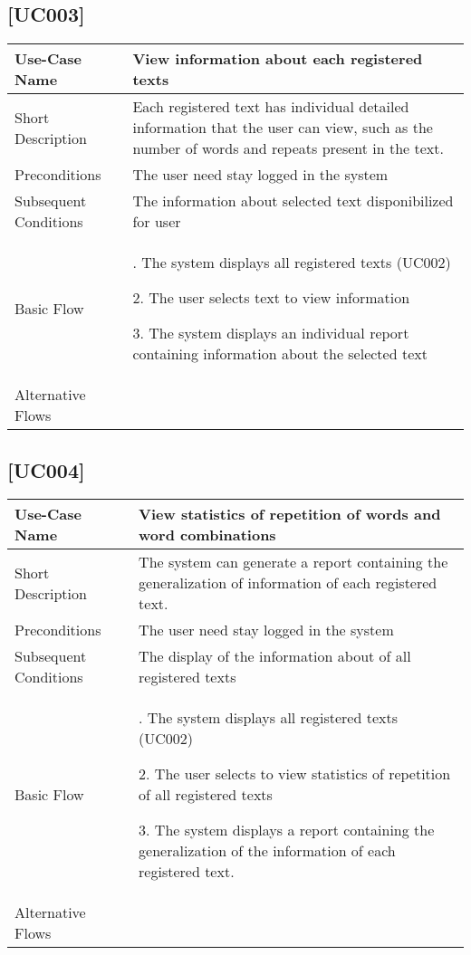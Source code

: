 \documentclass[11pt, twoside, a4paper]{book}
\begin{document}
			\subsection{[UC003]}			
				\begin{tabular}{|>{\centering\arraybackslash}m{6cm} |>{\centering\arraybackslash}m{6cm}|}										   			   									   \hline
					Use-Case Name 			& [UC003] View information about each registered texts																								\\ \hline
					Short Description  		& Each registered text has individual detailed information that the user can view, such as the number of words and repeats present in the text.    	\\ \hline	
					Preconditions  			& The user need stay logged in the system      																										\\ \hline
					Subsequent Conditions	& The information about selected text disponibilized for user																						\\ \hline
					Basic Flow  			& 	1. The system displays all registered texts	(UC002)													
											  
												2. The user selects text to view information														
											  
												3. The system displays an individual report containing information about the selected text														\\ \hline
				Alternative Flows  		&       																																				\\ \hline
			\end{tabular}
			
			\subsection{[UC004]}			
				\begin{tabular}{|>{\centering\arraybackslash}m{6cm} |>{\centering\arraybackslash}m{6cm}|}										   			   \hline
					Use-Case Name 			& [UC004] View statistics of repetition of words and word combinations											\\ \hline
					Short Description  		& The system can generate a report containing the generalization of information of each registered text.    	\\ \hline	
					Preconditions  			& The user need stay logged in the system      																	\\ \hline
					Subsequent Conditions	& The display of the information about of all registered texts													\\ \hline
					Basic Flow  			& 	1. The system displays all registered texts (UC002)   													
											  
												2. The user selects to view statistics of repetition of all registered texts											
											  
												3. The system displays a report containing the generalization of the information of each registered text.	\\ \hline
				Alternative Flows  		&       																											\\ \hline
			\end{tabular}
\end{document}
